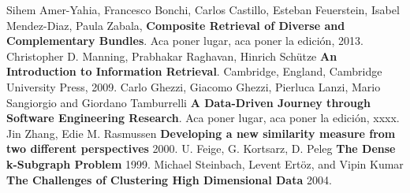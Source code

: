 \begin{thebibliography}{9}
  Sihem Amer-Yahia, Francesco Bonchi, Carlos Castillo,
  Esteban Feuerstein, Isabel Mendez-Diaz, Paula Zabala,
  \textbf{Composite Retrieval of Diverse and Complementary Bundles}.
  Aca poner lugar,
  aca poner la edición,
  2013.
  Christopher D. Manning, Prabhakar Raghavan, Hinrich Schütze
  \textbf{An Introduction to Information Retrieval}.
  Cambridge, England,
  Cambridge University Press,
  2009.
  Carlo Ghezzi, Giacomo Ghezzi, Pierluca Lanzi, Mario Sangiorgio and Giordano Tamburrelli
  \textbf{A Data-Driven Journey through Software Engineering Research}.
  Aca poner lugar,
  aca poner la edición,
  xxxx.
Jin Zhang, Edie M. Rasmussen
\textbf{Developing a new similarity measure from two different perspectives}
2000.
U. Feige, G. Kortsarz, D. Peleg
\textbf{The Dense k-Subgraph Problem}
1999.
Michael Steinbach, Levent Ertöz, and Vipin Kumar
\textbf{The Challenges of Clustering High Dimensional Data}
2004.


\end{thebibliography} 
